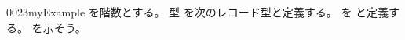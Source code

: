 \documentclass[index]{subfiles}
\begin{document}
\begin{myBlock}{0023}{myExample}
  を階数とする。
  型
  を次のレコード型と定義する。
  を
  と定義する。
  を示そう。
\end{myBlock}
\end{document}
